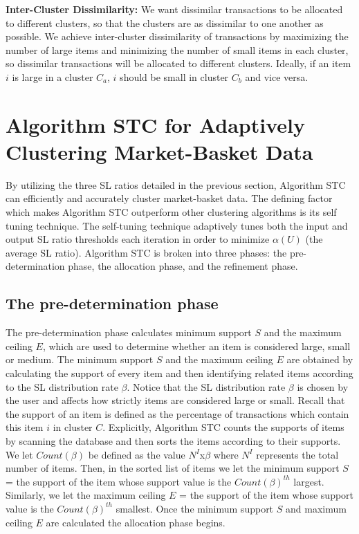\documentclass[11pt,reqno]{amsart}
\theoremstyle{definition}
\numberwithin{equation}{subsection}
\begin{document}
\textbf{Inter-Cluster Dissimilarity:} We want dissimilar transactions to be allocated to different clusters, so that the clusters are as dissimilar to one another as possible. We achieve inter-cluster dissimilarity of transactions by maximizing the number of large items and minimizing the number of small items in each cluster, so dissimilar transactions will be allocated to different clusters. Ideally, if an item $i$ is large in a cluster $C_a$, $i$ should be small in cluster $C_b$ and vice versa. 


\section{Algorithm STC for Adaptively Clustering Market-Basket Data}
 By utilizing the three SL ratios detailed in the previous section, Algorithm STC can efficiently and accurately cluster market-basket data. The defining factor which  makes Algorithm STC outperform other clustering algorithms is its self tuning technique. The self-tuning technique adaptively tunes both the input and output SL ratio thresholds each iteration in order to minimize $\alpha(U)$ (the average SL ratio). Algorithm STC is broken into three phases: the pre-determination phase, the allocation phase, and the refinement phase.

\subsection{The pre-determination phase}The pre-determination phase calculates minimum support $S$ and the maximum ceiling $E$, which are used to determine whether an item is considered large, small or medium. The minimum support $S$ and the maximum ceiling $E$ are obtained by calculating the support of every item and then identifying related items according to the SL distribution rate $\beta$.  Notice that the SL distribution rate $\beta$ is chosen by the user and affects how strictly items are considered large or small.  Recall that the support of an item is defined as the percentage of transactions which contain this item $i$ in cluster $C$. Explicitly, Algorithm STC counts the supports of items by scanning the database and then sorts the items according to their supports. We let $Count(\beta)$ be defined as the value $N^I$x$\beta$ where  $N^I$ represents the total number of items. Then, in the sorted list of items we let the minimum support $S$ = the support of the item whose support value is the $Count(\beta)^{th}$ largest.  Similarly, we let the maximum ceiling $E$ = the support of the item whose support value is the $Count(\beta)^{th}$ smallest. Once the minimum support $S$ and maximum ceiling $E$ are calculated the allocation phase begins.
\end{document}
